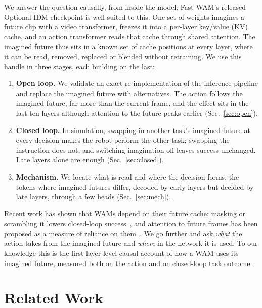\documentclass[conference]{IEEEtran}
\begin{document}
We answer the question causally, from inside the model. Fast-WAM's released Optional-IDM checkpoint is
well suited to this. One set of weights imagines a future clip with a video transformer, freezes it into a per-layer
key/value (KV) cache, and an action transformer reads that cache through shared attention. The imagined future thus
sits in a known set of cache positions at every layer, where it can be read, removed, replaced or blended without
retraining. We use this handle in three stages, each building on the last:
\begin{enumerate}
\item \textbf{Open loop.} We validate an exact re-implementation of the inference pipeline and replace the imagined
  future with alternatives. The action follows the imagined future, far more than the current frame, and the effect
  sits in the last ten layers although attention to the future peaks earlier (Sec.~\ref{sec:open}).
\item \textbf{Closed loop.} In simulation, swapping in another task's imagined future at every decision makes the
  robot perform the other task; swapping the instruction does not, and switching imagination off leaves success
  unchanged. Late layers alone are enough (Sec.~\ref{sec:closed}).
\item \textbf{Mechanism.} We locate what is read and where the decision forms: the tokens where imagined futures
  differ, decoded by early layers but decided by late layers, through a few heads (Sec.~\ref{sec:mech}).
\end{enumerate}
Recent work has shown that WAMs depend on their future cache: masking or scrambling it lowers closed-loop
success~\cite{zhang2026rift}, and attention to future frames has been proposed as a measure of reliance on
them~\cite{mishra2026temporal}. We go further and ask \emph{what} the action takes from the imagined future and
\emph{where} in the network it is used. To our knowledge this is the first
layer-level causal account of how a WAM uses its imagined future, measured both on the action and on closed-loop
task outcome.

\section{Related Work}
\end{document}
